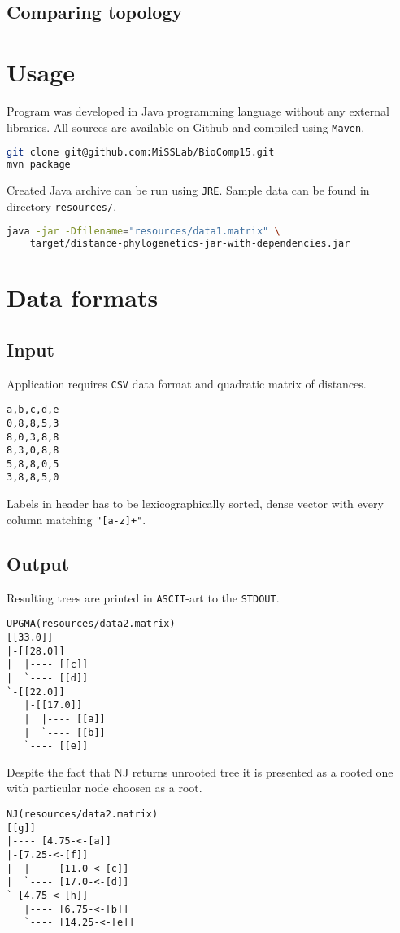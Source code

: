 \documentclass[a4paper,10pt]{article}
\begin{document}
\subsection{Comparing topology}

\section{Usage}
Program was developed in Java programming language without any external libraries. All sources are available on Github and compiled using \texttt{Maven}.
\begin{lstlisting}[language=bash,caption={Building project}]
git clone git@github.com:MiSSLab/BioComp15.git
mvn package
\end{lstlisting}
Created Java archive can be run using \texttt{JRE}. Sample data can be found in directory \texttt{resources/}.
\begin{lstlisting}[language=bash,caption={Running project using data1.matrix}]
java -jar -Dfilename="resources/data1.matrix" \
    target/distance-phylogenetics-jar-with-dependencies.jar
\end{lstlisting}

\section{Data formats}
\subsection{Input}
Application requires \texttt{CSV} data format and quadratic matrix of distances.

\begin{lstlisting}[caption={Example data file content}]
a,b,c,d,e
0,8,8,5,3
8,0,3,8,8
8,3,0,8,8
5,8,8,0,5
3,8,8,5,0
\end{lstlisting}
Labels in header has to be lexicographically sorted, dense vector with every column matching \texttt{"[a-z]+"}.
\subsection{Output}
Resulting trees are printed in \texttt{ASCII}-art to the \texttt{STDOUT}.
\begin{lstlisting}[caption={UPGMA output}]
UPGMA(resources/data2.matrix)
[[33.0]]
|-[[28.0]]
|  |---- [[c]]
|  `---- [[d]]
`-[[22.0]]
   |-[[17.0]]
   |  |---- [[a]]
   |  `---- [[b]]
   `---- [[e]]
\end{lstlisting}

Despite the fact that NJ returns unrooted tree it is presented as a rooted one with particular node choosen as a root.
\begin{lstlisting}[caption={NJ output}]
NJ(resources/data2.matrix)
[[g]]
|---- [4.75-<-[a]]
|-[7.25-<-[f]]
|  |---- [11.0-<-[c]]
|  `---- [17.0-<-[d]]
`-[4.75-<-[h]]
   |---- [6.75-<-[b]]
   `---- [14.25-<-[e]]
\end{lstlisting}
\end{document}
